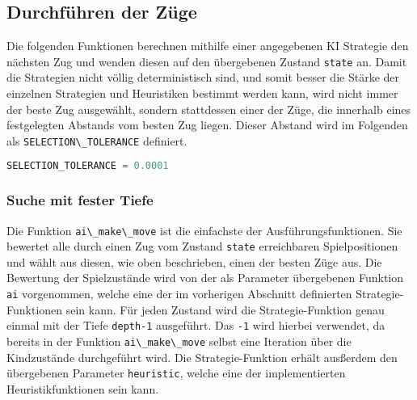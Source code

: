 \hypertarget{durchfuxfchren-der-zuxfcge}{%
\subsection{Durchführen der Züge}\label{durchfuxfchren-der-zuxfcge}}

Die folgenden Funktionen berechnen mithilfe einer angegebenen \ac{KI}
Strategie den nächsten Zug und wenden diesen auf den übergebenen Zustand
\passthrough{\lstinline!state!} an. Damit die Strategien nicht völlig
deterministisch sind, und somit besser die Stärke der einzelnen
Strategien und Heuristiken bestimmt werden kann, wird nicht immer der
beste Zug ausgewählt, sondern stattdessen einer der Züge, die innerhalb
eines festgelegten Abstands vom besten Zug liegen. Dieser Abstand wird
im Folgenden als \passthrough{\lstinline!SELECTION\_TOLERANCE!}
definiert.

\begin{lstlisting}[language=Python]
SELECTION_TOLERANCE = 0.0001
\end{lstlisting}

\hypertarget{suche-mit-fester-tiefe}{%
\subsubsection{Suche mit fester Tiefe}\label{suche-mit-fester-tiefe}}

Die Funktion \passthrough{\lstinline!ai\_make\_move!} ist die einfachste
der Ausführungsfunktionen. Sie bewertet alle durch einen Zug vom Zustand
\passthrough{\lstinline!state!} erreichbaren Spielpositionen und wählt
aus diesen, wie oben beschrieben, einen der besten Züge aus. Die
Bewertung der Spielzustände wird von der als Parameter übergebenen
Funktion \passthrough{\lstinline!ai!} vorgenommen, welche eine der im
vorherigen Abschnitt definierten Strategie-Funktionen sein kann. Für
jeden Zustand wird die Strategie-Funktion genau einmal mit der Tiefe
\passthrough{\lstinline!depth-1!} ausgeführt. Das
\passthrough{\lstinline!-1!} wird hierbei verwendet, da bereits in der
Funktion \passthrough{\lstinline!ai\_make\_move!} selbst eine Iteration
über die Kindzustände durchgeführt wird. Die Strategie-Funktion erhält
ausßerdem den übergebenen Parameter \passthrough{\lstinline!heuristic!},
welche eine der implementierten Heuristikfunktionen sein kann.

